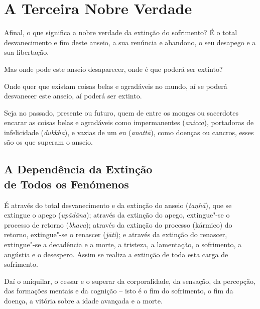 
\chapter{A Terceira Nobre Verdade}


Afinal, o que significa a nobre verdade da extinção do sofrimento? É o total
desvanecimento e fim deste anseio, a sua renúncia e abandono, o seu desapego e a
sua libertação.

Mas onde pode este anseio desaparecer, onde é que poderá ser extinto?

Onde quer que existam coisas belas e agradáveis no mundo, aí se poderá desvanecer este anseio, aí poderá ser extinto.


Seja no passado, presente ou futuro, quem de entre os monges ou sacerdotes
encarar as coisas belas e agradáveis como impermanentes (\emph{anicca}),
portadoras de infelicidade (\emph{dukkha}), e vazias de um eu (\emph{anattā}),
como doenças ou cancros, esses são os que superam o anseio.


\section{A Dependência da Extinção\\ de Todos os Fenómenos}

É através do total desvanecimento e da extinção do anseio (\emph{taṇhā}), que se
extingue o apego (\emph{upādāna}); através da extinção do apego, extingue"-se o
processo de retorno (\emph{bhava}); através da extinção do processo (kármico) do
retorno, extingue"-se o renascer (\emph{jāti}); e através da extinção do
renascer, extingue"-se a decadência e a morte, a tristeza, a lamentação, o
sofrimento, a angústia e o desespero. Assim se realiza a extinção de toda esta
carga de sofrimento.


Daí o aniquilar, o cessar e o superar da corporalidade, da sensação, da
percepção, das formações mentais e da cognição -- isto é o fim do sofrimento, o
fim da doença, a vitória sobre a idade avançada e a morte.


